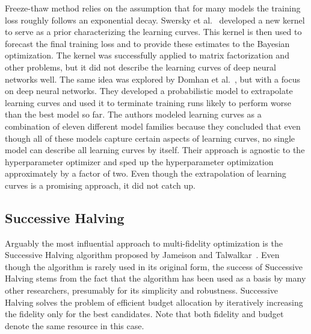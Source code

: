 Freeze-thaw method relies on the assumption that for many models the training loss roughly follows an exponential decay. Swersky et al.~\cite{swersky2014freeze} developed a new kernel to serve as a prior characterizing the learning curves. This kernel is then used to forecast the final training loss and to provide these estimates to the Bayesian optimization. The kernel was successfully applied to matrix factorization and other problems, but it did not describe the learning curves of deep neural networks well. The same idea was explored by Domhan et al.~\cite{domhan2015speeding}, but with a focus on deep neural networks. They developed a probabilistic model to extrapolate learning curves and used it to terminate training runs likely to perform worse than the best model so far. The authors modeled learning curves as a combination of eleven different model families because they concluded that even though all of these models capture certain aspects of learning curves, no single model can describe all learning curves by itself. Their approach is agnostic to the hyperparameter optimizer and sped up the hyperparameter optimization approximately by a factor of two. Even though the extrapolation of learning curves is a promising approach, it did not catch up.

\subsection{Successive Halving}
 Arguably the most influential approach to multi-fidelity optimization is the Successive Halving algorithm proposed by Jameison and Talwalkar~\cite{jamieson16}. Even though the algorithm is rarely used in its original form, the success of Successive Halving stems from the fact that the algorithm has been used as a basis by many other researchers, presumably for its simplicity and robustness. Successive Halving solves the problem of efficient budget allocation by iteratively increasing the fidelity only for the best candidates. Note that both fidelity and budget denote the same resource in this case.

